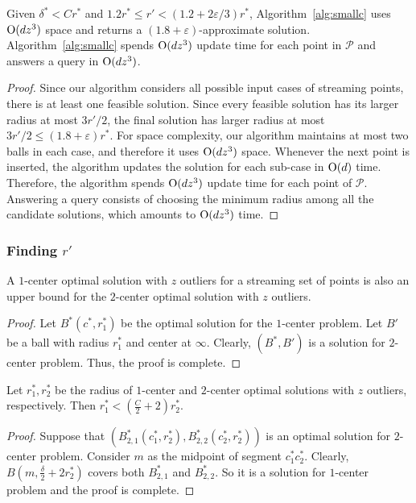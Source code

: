 \documentclass[envcountsame]{cls/cccg15}
\newcommand{\cO}{\ensuremath{{\rm O}}}
\newcommand{\lee}{\leqslant}
\renewcommand{\le}{\lee}
\newcommand{\eps}{\varepsilon}
\begin{document}
\begin{theorem}
Given $\delta^* < C r^*$ and $1.2r^* \le r' < (1.2 + 2\eps/3)r^*$, Algorithm~\ref{alg:smallc} uses $\cO (dz^3)$ space and returns a $(1.8+\eps)$-approximate solution. Algorithm~\ref{alg:smallc} spends $\cO (dz^3)$ update time for each point in $\mathcal{P}$ and answers a query in $\cO (dz^3)$.
\end{theorem}

\begin{proof}
Since our algorithm considers all possible input cases of streaming points, there is at least one feasible solution. Since every feasible solution has its larger radius at most $3r'/2$, the final solution has larger radius at most $3r'/2 \le (1.8 + \eps)r^*$.
For space complexity, our algorithm maintains at most two balls in each case, and therefore it uses $\cO(dz^3)$ space. Whenever the next point is inserted, the algorithm updates the solution for each sub-case in $\cO (d)$ time. Therefore, the algorithm spends $\cO (dz^3)$ update time for each point of $\mathcal{P}$. Answering a query consists of choosing the minimum radius among all the candidate solutions, which amounts to $\cO (dz^3)$ time.
\end{proof}


\subsubsection{Finding $r'$}
\label{subsec:findr}

\begin{lemma}
\label{lem:1lt2}
A $1$-center optimal solution with $z$ outliers for a streaming set of points is also an upper bound for the $2$-center optimal solution with $z$ outliers.
\end{lemma}
\begin{proof}
Let $B^*(c^*, r_1^*)$ be the optimal solution for the $1$-center problem. Let $B'$ be a ball with radius $r_1^*$ and center at $\infty$. Clearly, $(B^*, B')$ is a solution for $2$-center problem. Thus, the proof is complete.
\end{proof}

\begin{lemma}
\label{lem:2lt1}
Let $r_1^*, r_2^*$ be the radius of $1$-center and $2$-center optimal solutions with $z$ outliers, respectively. Then $r_1^* < \left(\frac{C}{2} + 2\right) r_2^*$.
\end{lemma}
\begin{proof}
Suppose that $(B_{2, 1}^*(c_1^*, r_2^*), B_{2,2}^*(c_2^*, r_2^*))$ is an optimal solution for $2$-center problem. Consider $m$ as the midpoint of segment 
$c_1^*c_2^*$.
Clearly, $B\left(m, \frac{\delta}{2} + 2r_2^*\right)$ covers both $B_{2, 1}^*$ and $B_{2,2}^*$. So it is a solution for $1$-center problem and the proof is complete.
\end{proof}
\end{document}
